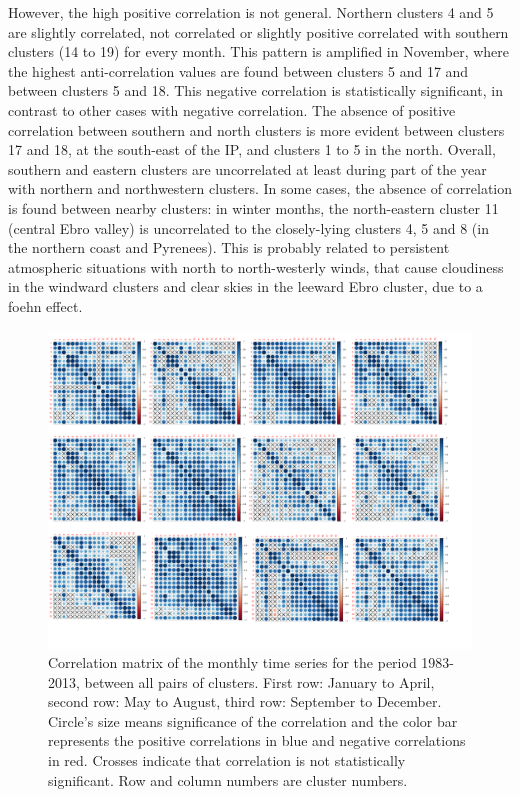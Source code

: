 \begin{subappendices}
However, the high positive correlation is not general. Northern clusters 4 and 5 are slightly correlated, not correlated or slightly positive correlated with southern clusters (14 to 19) for every month. This pattern is amplified in November, where the highest anti-correlation values are found between clusters 5 and 17 and between clusters 5 and 18. This negative correlation is statistically significant, in contrast to other cases with negative correlation. The absence of positive correlation between southern and north clusters is more evident between clusters 17 and 18, at the south-east of the IP, and clusters 1 to 5 in the north. Overall, southern and eastern clusters are uncorrelated at least during part of the year with northern and northwestern clusters. In some cases, the absence of correlation is found between nearby clusters: in winter months, the north-eastern cluster 11 (central Ebro valley) is uncorrelated to the closely-lying clusters 4, 5 and 8 (in the northern coast and Pyrenees). This is probably related to persistent atmospheric situations with north to north-westerly winds, that cause cloudiness in the windward clusters and clear skies in the leeward Ebro cluster, due to a foehn effect.


\begin{figure} [h!]
\includegraphics[scale=0.5]{figs/capitulo5/correlaciones_30}
\caption{Correlation matrix of the monthly time series for the period 1983-2013, between all pairs of clusters. First row: January to April, second row: May to August, third row: September to December. Circle’s size means significance of the correlation and the color bar represents the positive correlations in blue and negative correlations in red. Crosses indicate that correlation is not statistically significant. Row and column numbers are cluster numbers.}
\label{correlaciones_30}
\end{figure}

\end{subappendices}

